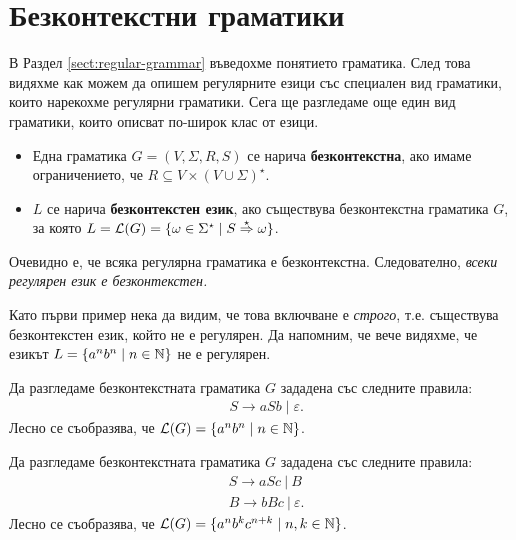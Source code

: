 \section{Безконтекстни граматики}


В Раздел \ref{sect:regular-grammar} въведохме понятието граматика. След това видяхме как можем да опишем регулярните езици
със специален вид граматики, които нарекохме регулярни граматики.
Сега ще разгледаме още един вид граматики, които описват по-широк клас от езици.

\begin{itemize}
\item 
  Една граматика $G = (V, \Sigma, R, S)$ се нарича {\bf безконтекстна}, ако 
  имаме ограничението, че $R \subseteq V\times (V\cup\Sigma)^\star$.
\item
  $L$ се нарича {\bf безконтекстен език}, ако съществува безконтекстна граматика $G$, за която 
  $L = \mathcal{L}(G) = \{\omega \in \Sigma^\star \mid S \stackrel{{\star}}{\Rightarrow} \omega\}$.
\end{itemize}

\begin{remark}
  Очевидно е, че всяка регулярна граматика е безконтекстна. Следователно, 
  {\em всеки регулярен език е безконтекстен.}
\end{remark}

Като първи пример нека да видим, че това включване е {\em строго}, т.е. съществува безконтекстен език, който не е регулярен.
Да напомним, че вече видяхме, че езикът $L = \{a^nb^n \mid n\in\mathbb{N}\}$ не е регулярен.

\begin{example}
  Да разгледаме безконтекстната граматика $G$ зададена със следните правила:
  \begin{align*}
    & S \to aSb \mid \varepsilon.
  \end{align*}
  Лесно се съобразява, че $\mathcal{L}(G) = \{a^nb^n \mid n\in\mathbb{N}\}$.
\end{example}

\begin{example}
  Да разгледаме безконтекстната граматика $G$ зададена със следните правила:
  \begin{align*}
    & S \to aSc\ |\  B\\
    & B \to bBc\ |\ \varepsilon.
  \end{align*}
  Лесно се съобразява, че $\mathcal{L}(G) = \{a^nb^kc^{n+k} \mid n,k\in\mathbb{N}\}$.
\end{example}

